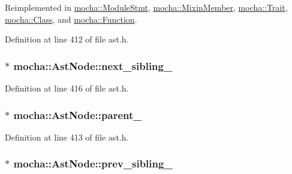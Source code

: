 Reimplemented in \hyperlink{classmocha_1_1_module_stmt_aca6fd8961e4bc109ab793c5a4392478d}{mocha::ModuleStmt}, \hyperlink{classmocha_1_1_mixin_member_a64c00fce7cbe0f639dc2292dd3e785e5}{mocha::MixinMember}, \hyperlink{classmocha_1_1_trait_ae5c62637bd661cf4b74b4f57defb2cca}{mocha::Trait}, \hyperlink{classmocha_1_1_class_a059fb140e1ab511f2d40ac3f6792d108}{mocha::Class}, and \hyperlink{classmocha_1_1_function_ac2e4d75b6c293a0f2d6344df8cdc10e7}{mocha::Function}.



Definition at line 412 of file ast.h.

\hypertarget{classmocha_1_1_ast_node_a20376498021723661925c094ec358ffa}{
\subsubsection[{next\_\-sibling\_\-}]{$\ast$ {\bf mocha::AstNode::next\_\-sibling\_\-}}}
\label{classmocha_1_1_ast_node_a20376498021723661925c094ec358ffa}


Definition at line 416 of file ast.h.

\hypertarget{classmocha_1_1_ast_node_a0e54d89150bb432e02a4b5d7be77b123}{
\subsubsection[{parent\_\-}]{$\ast$ {\bf mocha::AstNode::parent\_\-}}}
\label{classmocha_1_1_ast_node_a0e54d89150bb432e02a4b5d7be77b123}


Definition at line 413 of file ast.h.

\hypertarget{classmocha_1_1_ast_node_abcf6ff00015261ce21a4ce6e7dfe9e1d}{
\subsubsection[{prev\_\-sibling\_\-}]{$\ast$ {\bf mocha::AstNode::prev\_\-sibling\_\-}}}
\label{classmocha_1_1_ast_node_abcf6ff00015261ce21a4ce6e7dfe9e1d}


